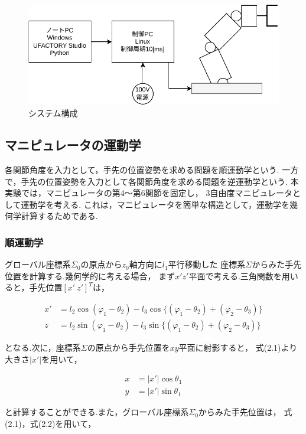 \begin{figure}[h]
  \centering
  \includegraphics[scale=1]{sozai/1.pdf}
  \caption{システム構成}
\end{figure}


\subsection{マニピュレータの運動学}
各関節角度を入力として，手先の位置姿勢を求める問題を順運動学という.
一方で，手先の位置姿勢を入力として各関節角度を求める問題を逆運動学という.
本実験では，マニピュレータの第4～第6関節を固定し，
3自由度マニピュレータとして運動学を考える.
これは，マニピュレータを簡単な構造として，運動学を幾何学計算するためである.

\subsubsection{順運動学}
グローバル座標系$\Sigma_0$の原点から$z_0$軸方向に$l_1$平行移動した
座標系$\Sigma$からみた手先位置を計算する.幾何学的に考える場合，
まず$x'z'$平面で考える.三角関数を用いると，手先位置$[x' \ z']^T$は，

\begin{align}
  x' & = l_2 \cos (\varphi_1 - \theta_2) - l_3 \cos \{ (\varphi_1 - \theta_2) + (\varphi_2 - \theta_3) \} \tag{2.1} \\
  z  & = l_2 \sin (\varphi_1 - \theta_2) - l_3 \sin \{ (\varphi_1 - \theta_2) + (\varphi_2 - \theta_3) \} 
\end{align}

となる.次に，座標系$\Sigma$の原点から手先位置を$xy$平面に射影すると，
式(2.1)より大きさ$|x'|$を用いて，

\begin{align}
  x & = |x'| \cos \theta_1 \tag{2.2} \\
  y & = |x'| \sin \theta_1 
\end{align}

と計算することができる.また，グローバル座標系$\Sigma_0$からみた手先位置は，
式(2.1)，式(2.2)を用いて，

